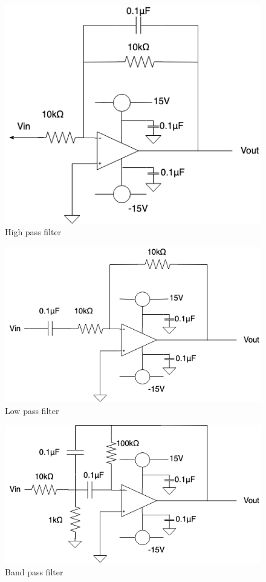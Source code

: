 \documentclass[11pt, a4paper,twocolumn]{jarticle}
\begin{document}
\begin{figure}[htbp]
 \begin{center}
  \includegraphics[width=0.8\linewidth]{fig12.png}
 \end{center}
 \caption{High pass filter}
 \label{fig:12}
\end{figure}

\begin{figure}[htbp]
 \begin{center}
  \includegraphics[width=0.8\linewidth]{fig13.png}
 \end{center}
 \caption{Low pass filter}
 \label{fig:13}
\end{figure}

\begin{figure}[htbp]
 \begin{center}
  \includegraphics[width=0.8\linewidth]{fig14.png}
 \end{center}
 \caption{Band pass filter}
 \label{fig:14}
\end{figure}
\end{document}
